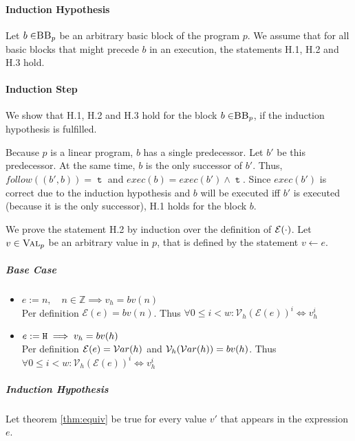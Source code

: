 \paragraph{Induction Hypothesis}
Let $b \in \mbb_p$ be an arbitrary basic block of the program $p$. We assume that for all basic blocks that might precede $b$ in an execution, the statements H.1, H.2 and H.3 hold.

\paragraph{Induction Step}
We show that H.1, H.2 and H.3 hold for the block $b \in \mbb_p$, if the induction hypothesis is fulfilled.

Because $p$ is a linear program, $b$ has a single predecessor. Let $b'$ be this predecessor. At the same time, $b$ is the only successor of $b'$. Thus, $follow((b', b)) = \mttt$ and $exec(b) = exec(b') \land \mttt$. Since $exec(b')$ is correct due to the induction hypothesis and $b$ will be executed iff $b'$ is executed (because it is the only successor),  H.1 holds for the block $b$.

We prove the statement H.2 by induction over the definition of $\mathcal{E}(\cdot)$. Let $v \in \textsc{Val}_p$ be an arbitrary value in $p$, that is defined by the statement $v \leftarrow e$.

\subparagraph{Base Case}
\begin{itemize}
    \item $e := n, \quad n \in \mathbb{Z} \implies v_h = bv(n)$\\
    Per definition $\mathcal{E}(e) = bv(n)$. Thus $\forall 0 \leq i < w: \mathcal{V}_h(\mathcal{E}(e))^i \iff v_h^i$
    
    \item $e := \mathtt{H} \implies v_h = bv(h)$\\
    Per definition $\mathcal{E}(e) = \mathcal{V}ar(h)$ and $\mathcal{V}_h(\mathcal{V}ar(h)) = bv(h)$. Thus\\ $\forall 0 \leq i < w: \mathcal{V}_h(\mathcal{E}(e))^i \iff v_h^i$
    
\end{itemize}

\subparagraph{Induction Hypothesis}
    Let theorem \ref{thm:equiv} be true for every value $v'$ that appears in the expression $e$.
    
